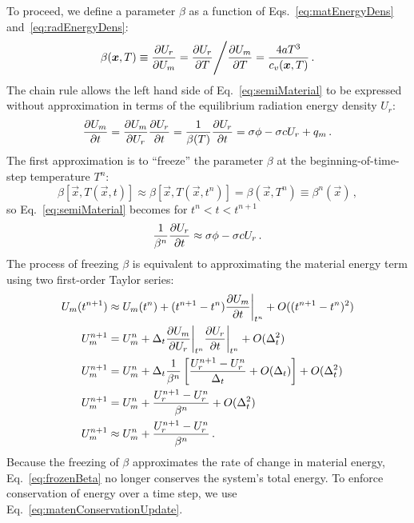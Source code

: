 To proceed, we define a parameter $\beta$ as a function of
Eqs.~\eqref{eq:matEnergyDens} and~\eqref{eq:radEnergyDens}:
\begin{equation} \label{eq:beta}
  \beta(\bm{x}, T) \equiv \frac{\partial U_r}{\partial U_m} 
  = \frac{\partial U_r}{\partial T} \Bigg/ \frac{\partial U_m}{\partial T}
  = \frac{4 a T^3}{c_v(\bm{x}, T)} \,.
\end{equation}
The chain rule allows the left hand side of Eq.~\eqref{eq:semiMaterial} to be
expressed without approximation in terms of the equilibrium radiation energy
density $U_r$:
\begin{equation*}
  \frac{\partial U_m}{\partial t} = \frac{\partial U_m}{\partial U_r} \frac{\partial U_r}{\partial t} = \frac{1}{\beta(T)}
  \frac{\partial U_r}{\partial t} = \sigma \phi - \sigma c U_r + q_m \,.
\end{equation*}
The first approximation is to ``freeze'' the parameter $\beta$ at the
beginning-of-time-step temperature $T^n$:
\begin{equation*}
  \beta[\vec{x},T(\vec{x},t)] \approx \beta[\vec{x},T(\vec{x},t^n)]
  = \beta(\vec{x}, T^n) \equiv \beta^n(\vec{x})\,,
\end{equation*}
so Eq.~\eqref{eq:semiMaterial} becomes for $t^n < t < t^{n+1}$
\begin{equation}\label{eq:frozenBeta}
  \frac{1}{\beta^n}
  \frac{\partial U_r}{\partial t} \approx \sigma \phi - \sigma c U_r \,.
\end{equation}
The process of freezing $\beta$ is equivalent to approximating the
material energy term using two first-order Taylor series:
\begin{align} \nonumber
  U_m(t^{n+1})
  &\approx U_m(t^n) + (t^{n+1} - t^n) \frac{\partial U_m}{\partial t}\bigg|_{t^n} + O( (t^{n+1} - t^n)^2)
  \\ \nonumber
  U_m^{n+1}
  &= U_m^n + \Delta_t \frac{\partial U_m}{\partial U_r}\bigg|_{t^n} \frac{\partial U_r}{\partial t}\bigg|_{t^n}
  + O( \Delta_t^2 )
  \\ \nonumber
   U_m^{n+1}
   &= U_m^n + \Delta_t \frac{1}{\beta^n} \left[ \frac{U_r^{n+1} - U_r^n}{\Delta_t} +
  O(\Delta_t) \right]
  + O( \Delta_t^2 )
  \\ \nonumber
   U_m^{n+1}
  &= U_m^n + \frac{U_r^{n+1} - U_r^n}{\beta^n} + O( \Delta_t^2 )
  \\
  \label{eq:matenConservationUpdate}
  U_m^{n+1}
  &\approx U_m^n + \frac{U_r^{n+1} - U_r^n}{\beta^n} \,.
\end{align}
Because the freezing of $\beta$ approximates the rate of change
in material energy, Eq.~\eqref{eq:frozenBeta} no longer conserves the system's
total energy. To enforce conservation of energy over a time step, we use
Eq.~\eqref{eq:matenConservationUpdate}.

